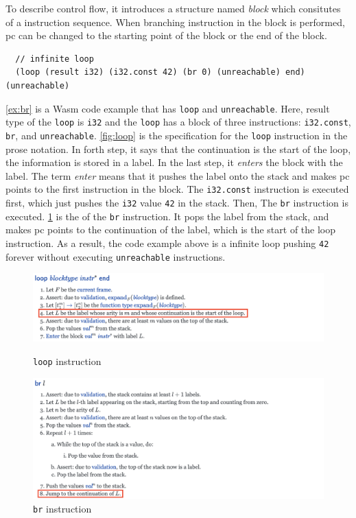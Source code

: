 To describe control flow, it introduces a structure named \textit{block} which
consitutes of a instruction sequence.
When branching instruction in the block is performed, pc can be changed to the
starting point of the block or the end of the block.


\begin{example}
\label{ex:br}
\begin{verbatim}
  // infinite loop
  (loop (result i32) (i32.const 42) (br 0) (unreachable) end) (unreachable)
\end{verbatim}
\end{example}

\cref{ex:br} is a Wasm code example that has \texttt{loop} and
\texttt{unreachable}.
Here, result type of the \texttt{loop} is \texttt{i32} and the \texttt{loop}
has a block of three instructions: \texttt{i32.const}, \texttt{br}, and
\texttt{unreachable}.
\cref{fig:loop} is the specification for the \texttt{loop} instruction in the
prose notation.
In forth step, it says that the continuation is the start of the loop, the
information is stored in a label.
In the last step, it \textit{enters} the block with the label.
The term \textit{enter} means that it pushes the label onto the stack and makes
pc points to the first instruction in the block.
The \texttt{i32.const} instruction is executed first, which just pushes the
\texttt{i32} value \texttt{42} in the stack.
Then, The \texttt{br} instruction is executed.
\cref{fig:br} is the \officialp{} of the \texttt{br} instruction.
It pops the label from the stack, and makes pc points to the continuation of
the label, which is the start of the loop instruction.
As a result, the code example above is a infinite loop pushing \texttt{42}
forever without executing \texttt{unreachable} instructions.

\begin{figure}[h!]
    \centerline{\includegraphics[width=15cm]{fig/loop}}
    \caption[Enter the caption title here]{\texttt{loop} instruction} \label{fig:loop}
    \centerline{\includegraphics[width=15cm]{fig/br}}
    \caption[Enter the caption title here]{\texttt{br} instruction} \label{fig:br}
\end{figure}


